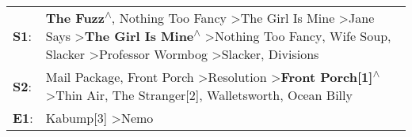 \begin{supertabular}{p{0.03\textwidth}p{0.92\textwidth}}
 \textbf{S1}:  &  \textbf{The Fuzz\textsuperscript{$\wedge$}}, \enspace Nothing Too Fancy\textsuperscript{} \textgreater \enspace The Girl Is Mine\textsuperscript{} \textgreater \enspace Jane Says\textsuperscript{} \textgreater \enspace \textbf{The Girl Is Mine\textsuperscript{$\wedge$}} \textgreater \enspace Nothing Too Fancy\textsuperscript{}, \enspace Wife Soup\textsuperscript{}, \enspace Slacker\textsuperscript{} \textgreater \enspace Professor Wormbog\textsuperscript{} \textgreater \enspace Slacker\textsuperscript{}, \enspace Divisions\textsuperscript{}  \enspace  \\
 \textbf{S2}:  &                                                                                                                                                                                     Mail Package\textsuperscript{}, \enspace Front Porch\textsuperscript{} \textgreater \enspace Resolution\textsuperscript{} \textgreater \enspace \textbf{Front Porch[1]\textsuperscript{$\wedge$}} \textgreater \enspace Thin Air\textsuperscript{}, \enspace The Stranger[2]\textsuperscript{}, \enspace Walletsworth\textsuperscript{}, \enspace Ocean Billy\textsuperscript{}  \enspace  \\
 \textbf{E1}:  &                                                                                                                                                                                                                                                                                                                                                                                                                                                                                            Kabump[3]\textsuperscript{} \textgreater \enspace Nemo\textsuperscript{}  \enspace  \\
\end{supertabular}
